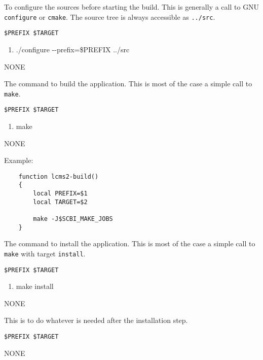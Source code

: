 \documentclass[a4paper,12pt,twoside]{article}
\newcommand{\code}[1]{\texttt{#1}}
\newcommand{\ddash}{-{}-}
\begin{document}
\begin{description}[font=\large\texttt]
	\item[<module>-config] To configure the sources before starting the build. This is generally a call to GNU \code{configure} or \code{cmake}. The source tree is always accessible as \code{../src}.
	\begin{description}[font=\textit,style=standard]
		\item[parameter] \tabto{2cm} \code{\$PREFIX \$TARGET}
		\begin{enumerate}
			\item ./configure \ddash{}prefix=\$PREFIX ../src
		\end{enumerate}
		\item[return] \tabto{2cm} NONE
	\end{description}

	\item[<module>-build] The command to build the application. This is most of the case a simple call to \code{make}.
	\begin{description}[font=\textit,style=standard]
		\item[parameter] \tabto{2cm} \code{\$PREFIX \$TARGET}
		\begin{enumerate}
			\item make
		\end{enumerate}
		\item[return] \tabto{2cm} NONE
	\end{description}

	Example:
	\begin{lstlisting}
	function lcms2-build()
	{
		local PREFIX=$1
		local TARGET=$2

		make -J$SCBI_MAKE_JOBS
	}
	\end{lstlisting}

	\item[<module>-install] The command to install the application. This is most of the case a simple call to \code{make} with target \code{install}.
	\begin{description}[font=\textit,style=standard]
		\item[parameter] \tabto{2cm} \code{\$PREFIX \$TARGET}
		\begin{enumerate}
			\item make install
		\end{enumerate}
		\item[return] \tabto{2cm} NONE
	\end{description}

	\item[<module>-wrapup] This is to do whatever is needed after the installation step.
	\begin{description}[font=\textit,style=standard]
		\item[parameter] \tabto{2cm} \code{\$PREFIX \$TARGET}
		\item[return] \tabto{2cm} NONE
	\end{description}


\end{description}
\end{document}
